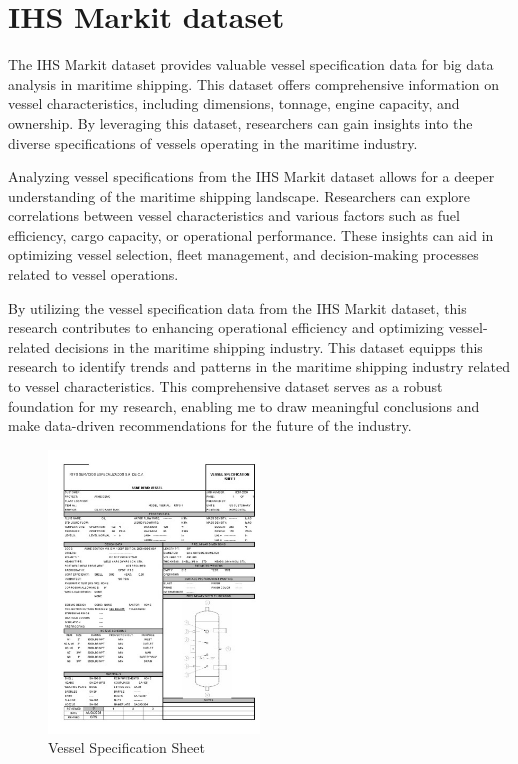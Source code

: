 \section{IHS Markit dataset}

The IHS Markit dataset provides valuable vessel specification data for big data analysis in maritime shipping.
This dataset offers comprehensive information on vessel characteristics, including dimensions, tonnage, engine capacity, and ownership.
By leveraging this dataset, researchers can gain insights into the diverse specifications of vessels operating in the maritime industry.

Analyzing vessel specifications from the IHS Markit dataset allows for a deeper understanding of the maritime shipping landscape.
Researchers can explore correlations between vessel characteristics and various factors such as fuel efficiency, cargo capacity, or operational performance.
These insights can aid in optimizing vessel selection, fleet management, and decision-making processes related to vessel operations.

By utilizing the vessel specification data from the IHS Markit dataset, this research contributes to enhancing operational efficiency and optimizing vessel-related decisions in the maritime shipping industry.
This dataset equipps this research to identify trends and patterns in the maritime shipping industry related to vessel characteristics.
This comprehensive dataset serves as a robust foundation for my research, enabling me to draw meaningful conclusions and make data-driven recommendations for the future of the industry.

\begin{figure}[h]
    \centering
    \includegraphics[width=0.5\textwidth]{images/vessel_specification.jpg}
    \caption{Vessel Specification Sheet \autocite{Itur}}
    \label{vessel_specification}
\end{figure}